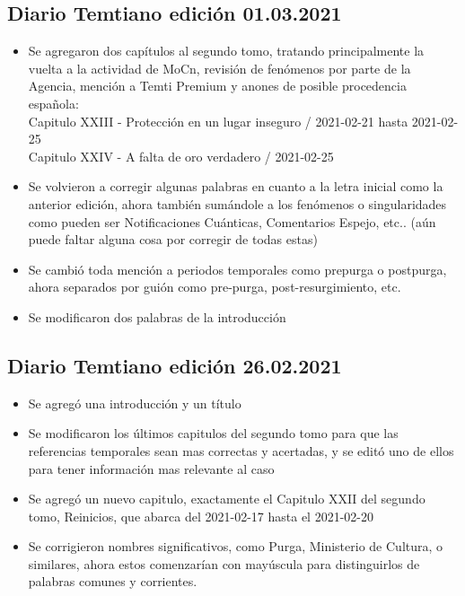 \documentclass[
]{book}
\begin{document}
\hypertarget{diario-temtiano-ediciuxf3n-01.03.2021}{%
\subsection*{Diario Temtiano edición 01.03.2021}\label{diario-temtiano-ediciuxf3n-01.03.2021}}

\begin{itemize}
\item
  Se agregaron dos capítulos al segundo tomo, tratando principalmente la vuelta a la actividad de MoCn, revisión de fenómenos por parte de la Agencia, mención a Temti Premium y anones de posible procedencia española:~\\
  Capitulo XXIII - Protección en un lugar inseguro / 2021-02-21 hasta 2021-02-25~\\
  Capitulo XXIV - A falta de oro verdadero / 2021-02-25
\item
  Se volvieron a corregir algunas palabras en cuanto a la letra inicial como la anterior edición, ahora también sumándole a los fenómenos o singularidades como pueden ser Notificaciones Cuánticas, Comentarios Espejo, etc.. (aún puede faltar alguna cosa por corregir de todas estas)
\item
  Se cambió toda mención a periodos temporales como prepurga o postpurga, ahora separados por guión como pre-purga, post-resurgimiento, etc.
\item
  Se modificaron dos palabras de la introducción
\end{itemize}

\hypertarget{diario-temtiano-ediciuxf3n-26.02.2021}{%
\subsection*{Diario Temtiano edición 26.02.2021}\label{diario-temtiano-ediciuxf3n-26.02.2021}}

\begin{itemize}
\item
  Se agregó una introducción y un título
\item
  Se modificaron los últimos capitulos del segundo tomo para que las referencias temporales sean mas correctas y acertadas, y se editó uno de ellos para tener información mas relevante al caso
\item
  Se agregó un nuevo capitulo, exactamente el Capitulo XXII del segundo tomo, Reinicios, que abarca del 2021-02-17 hasta el 2021-02-20
\item
  Se corrigieron nombres significativos, como Purga, Ministerio de Cultura, o similares, ahora estos comenzarían con mayúscula para distinguirlos de palabras comunes y corrientes.
\end{itemize}
\end{document}
